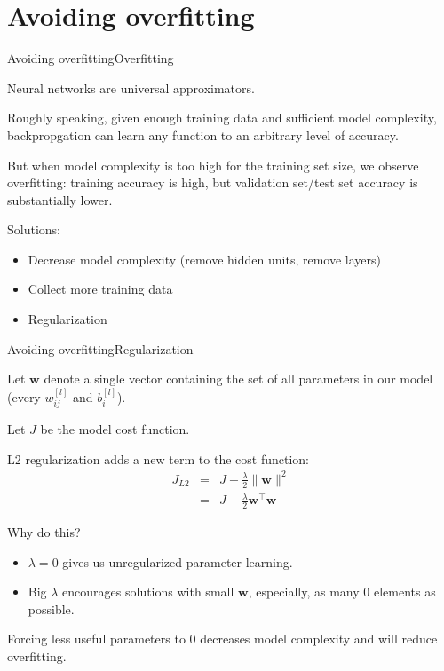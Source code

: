 \documentclass{beamer}
\renewcommand{\vec}[1]{\boldsymbol{#1}}
\begin{document}
\section{Avoiding overfitting}

\begin{frame}{Avoiding overfitting}{Overfitting}

  Neural networks are \alert{universal approximators}.

  \medskip

  Roughly speaking, given enough training data and sufficient model
  complexity, backpropgation can learn \alert{any function} to an
  arbitrary level of accuracy.

  \medskip

  But when model complexity is too high for the training set size, we
  observe \alert{overfitting}: training accuracy is high, but
  validation set/test set accuracy is substantially lower.

  \medskip

  Solutions:
  \begin{itemize}
  \item Decrease model complexity (remove hidden units, remove layers)
  \item Collect more training data
  \item Regularization
  \end{itemize}
  
\end{frame}


\begin{frame}{Avoiding overfitting}{Regularization}

  Let $\vec{w}$ denote a single vector containing the set of all
  parameters in our model (every $w^{[l]}_{ij}$ and $b^{[l]}_i$).

  \medskip

  Let $J$ be the model cost function.

  \medskip

  L2 regularization adds a new term to the cost function:
  \begin{eqnarray*}
    J_{L2} & = & J + \frac{\lambda}{2}\|\vec{w}\|^2 \\
    & = & J + \frac{\lambda}{2}\vec{w}^\top\vec{w}
  \end{eqnarray*}

  \medskip

  Why do this?
  \begin{itemize}
  \item $\lambda=0$ gives us unregularized parameter learning.
  \item Big $\lambda$ encourages solutions with small $\vec{w}$,
    especially, \alert{as many 0 elements as possible}.
  \end{itemize}

  Forcing less useful parameters to 0 decreases model complexity and
  will reduce overfitting.
  
\end{frame}
\end{document}
